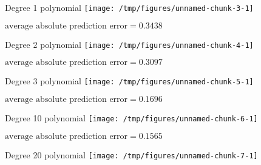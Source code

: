 \documentclass{beamer}\usepackage[]{graphicx}\usepackage[]{color}
\makeatletter
\def\maxwidth{ %
  \ifdim\Gin@nat@width>\linewidth
    \linewidth
  \else
    \Gin@nat@width
  \fi
}
\newenvironment{knitrout}{}{} %
\makeatother
\begin{document}
\begin{darkframes}
    \begin{frame}{Degree 1 polynomial}
\begin{knitrout}
\color{fgcolor}
\texttt{[image: /tmp/figures/unnamed-chunk-3-1]} 

\end{knitrout}
      \vspace{-1cm} $\text{average absolute prediction error} = 0.3438$
    \end{frame}

    \begin{frame}{Degree 2 polynomial}
\begin{knitrout}
\color{fgcolor}
\texttt{[image: /tmp/figures/unnamed-chunk-4-1]} 

\end{knitrout}
      \vspace{-1cm} $\text{average absolute prediction error} = 0.3097$
    \end{frame}

    \begin{frame}{Degree 3 polynomial}
\begin{knitrout}
\color{fgcolor}
\texttt{[image: /tmp/figures/unnamed-chunk-5-1]} 

\end{knitrout}
      \vspace{-1cm} $\text{average absolute prediction error} = 0.1696$
    \end{frame}

    \begin{frame}{Degree 10 polynomial}
\begin{knitrout}
\color{fgcolor}
\texttt{[image: /tmp/figures/unnamed-chunk-6-1]} 

\end{knitrout}
      \vspace{-1cm} $\text{average absolute prediction error} = 0.1565$
    \end{frame}

    \begin{frame}{Degree 20 polynomial}
\begin{knitrout}
\color{fgcolor}
\texttt{[image: /tmp/figures/unnamed-chunk-7-1]} 


\end{knitrout}
\end{frame}
\end{darkframes}
\end{document}
